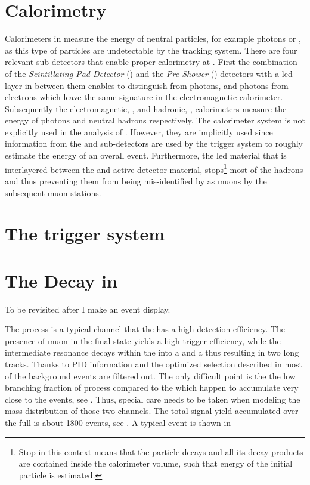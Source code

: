 \section{Calorimetry}
\label{det_calo}
Calorimeters in \lhcb measure the energy of neutral particles, for example photons or \piz,
as this type of particles are undetectable by the tracking system. There are four relevant sub-detectors
that enable proper calorimetry at \lhcb. First the combination of the {\it Scintillating Pad Detector} (\spd)
and the {\it Pre Shower} (\presh) detectors with a led layer in-between them enables to distinguish \piz from
photons, and photons from electrons which leave the same signature in the electromagnetic calorimeter.
Subsequently the electromagnetic, \ecal, and hadronic, \hcal, calorimeters measure the energy of photons
and neutral hadrons respectively. The calorimeter system is not explicitly used in the analysis of .
However, they are implicitly used since information from the \spd and \presh sub-detectors are used
by the \lzero trigger system to roughly estimate the energy of an overall event. Furthermore, the
led material that is interlayered between the \ecal and \hcal active detector material, stops\footnote{Stop
in this context means that the particle decays and all its decay products are contained inside the calorimeter
volume, such that energy of the initial particle is estimated.} most of the hadrons and thus preventing them
from being mis-identified by as muons by the subsequent muon stations.

\section{The trigger system}
\label{det_trigger}


\section{The \BJpsiKst Decay in \lhcb}
\label{BspsiKst_at_lhcb}
{\color{red} To be revisited after I make an event display.}

The \BsJpsiKst process is a typical channel that the \lhcb has a high detection efficiency.
The presence of muon in the final state yields a high trigger efficiency, while the intermediate
\Kstar resonance decays within the \velo into a \kaon and a \pion thus resulting in two long tracks.
Thanks to PID information and the optimized selection described in  most of the background
events are filtered out. The only difficult point is the the low branching fraction of \BsJpsiKst process
compared to the \BdJpsiKst which happen to accumulate very close to the \BsJpsiKst events, see .
Thus, special care needs to be taken when modeling the mass distribution of those two channels.
The total \BsJpsiKst signal yield accumulated over the full \runone is about 1800 events, see .
A typical \BsJpsiKst event is  shown in 

